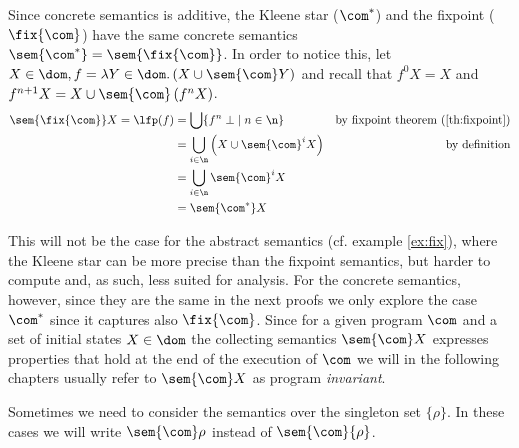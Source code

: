 Since concrete semantics is additive, the Kleene star (\(\com^*\)) and
the fixpoint (\(\fix{\com}\)) have the same concrete semantics
\(\sem{\com^*} = \sem{\fix{\com}}\). In order to notice this, let
\(X \in \dom, f = \lambda Y \in\dom . \left(X \cup
  \sem{\com}Y\right)\) and recall that \(f^0 X = X\) and 
\(f^{n+1} X = X \cup \sem{\com}\left(f^n X\right)\).
\begin{align*}
  \sem{\fix{\com}}X = \lfp(f) & = \bigcup \{ f^n \; \bot \mid n \in \n \} & \text{by fixpoint theorem (\ref{th:fixpoint})} \\
                              & = \bigcup_{i\in\n} \left( X \cup \sem{\com}^iX \right) & \text{by definition} \\
                              & = \bigcup_{i\in\n} \sem{\com}^i X \\
                              & = \sem{\com^*}X
\end{align*}

This will not be the case for the abstract semantics (cf. example
\ref{ex:fix}), where the Kleene star can be more precise than the
fixpoint semantics, but harder to compute and, as such, less suited
for analysis. For the concrete semantics, however, since they are the
same in the next proofs we only explore the case \(\com^*\) since it
captures also \(\fix{\com}\). Since for a given program \(\com\) and a
set of initial states \(X \in \dom\) the collecting semantics
\(\sem{\com}X\) expresses properties that hold at the end of the
execution of \(\com\) we will in the following chapters usually refer
to \(\sem{\com}X\) as program \emph{invariant}.

\begin{notation}
  Sometimes we need to consider the semantics over the singleton set
  \(\{\rho\}\). In these cases we will write \(\sem{\com}\rho\)
  instead of \(\sem{\com}\{\rho\}\).
\end{notation}


